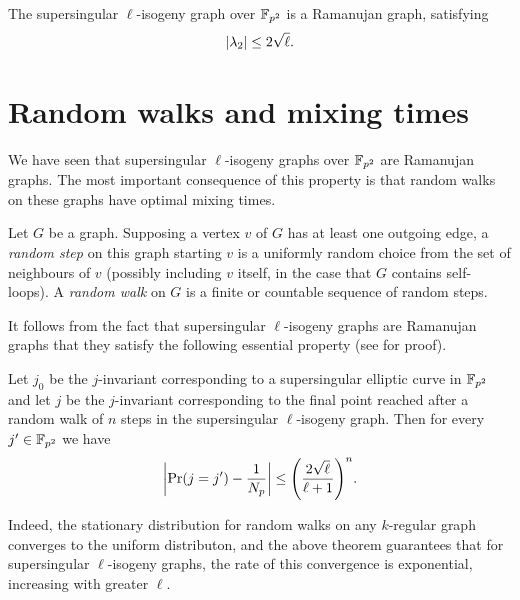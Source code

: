         \begin{property}
            The supersingular $\ell$-isogeny graph over $\mathbb{F}_{p^2}$ is a Ramanujan graph, satisfying
            \begin{equation*}
                \left\lvert\lambda_2\right\rvert \leq 2\sqrt{\ell}.
            \end{equation*}
        \end{property}

    \section{Random walks and mixing times}
        We have seen that supersingular $\ell$-isogeny graphs over $\mathbb{F}_{p^2}$ are Ramanujan graphs. The most important consequence of this property is that random walks on these graphs have optimal mixing times.

        \begin{definition}
            Let $G$ be a graph. Supposing a vertex $v$ of $G$ has at least one outgoing edge, a \textit{random step} on this graph starting $v$ is a uniformly random choice from the set of neighbours of $v$ (possibly including $v$ itself, in the case that $G$ contains self-loops). A \textit{random walk} on $G$ is a finite or countable sequence of random steps.
        \end{definition}

        It follows from the fact that supersingular $\ell$-isogeny graphs are Ramanujan graphs that they satisfy the following essential property (see \cite[Theorem 1]{GPS17} for proof).

        \begin{property}
            Let $j_0$ be the $j$-invariant corresponding to a supersingular elliptic curve in $\mathbb{F}_{p^2}$ and let $j$ be the $j$-invariant corresponding to the final point reached after a random walk of $n$ steps in the supersingular $\ell$-isogeny graph. Then for every $j' \in \mathbb{F}_{p^2}$ we have
            \begin{equation*}
                \abs{\Pr(j = j') - \frac{1}{N_p}} \leq \brac{\frac{2\sqrt{\ell}}{\ell+1}}^n.
            \end{equation*} 
        \end{property}

        Indeed, the stationary distribution for random walks on any $k$-regular graph converges to the uniform distributon, and the above theorem guarantees that for supersingular $\ell$-isogeny graphs, the rate of this convergence is exponential, increasing with greater $\ell$.

